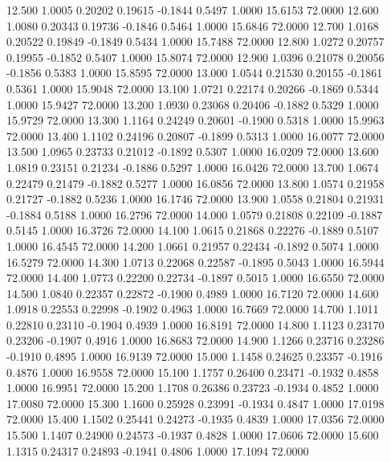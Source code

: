   12.500   1.0005   0.20202   0.19615  -0.1844   0.5497   1.0000  15.6153  72.0000
  12.600   1.0080   0.20343   0.19736  -0.1846   0.5464   1.0000  15.6846  72.0000
  12.700   1.0168   0.20522   0.19849  -0.1849   0.5434   1.0000  15.7488  72.0000
  12.800   1.0272   0.20757   0.19955  -0.1852   0.5407   1.0000  15.8074  72.0000
  12.900   1.0396   0.21078   0.20056  -0.1856   0.5383   1.0000  15.8595  72.0000
  13.000   1.0544   0.21530   0.20155  -0.1861   0.5361   1.0000  15.9048  72.0000
  13.100   1.0721   0.22174   0.20266  -0.1869   0.5344   1.0000  15.9427  72.0000
  13.200   1.0930   0.23068   0.20406  -0.1882   0.5329   1.0000  15.9729  72.0000
  13.300   1.1164   0.24249   0.20601  -0.1900   0.5318   1.0000  15.9963  72.0000
  13.400   1.1102   0.24196   0.20807  -0.1899   0.5313   1.0000  16.0077  72.0000
  13.500   1.0965   0.23733   0.21012  -0.1892   0.5307   1.0000  16.0209  72.0000
  13.600   1.0819   0.23151   0.21234  -0.1886   0.5297   1.0000  16.0426  72.0000
  13.700   1.0674   0.22479   0.21479  -0.1882   0.5277   1.0000  16.0856  72.0000
  13.800   1.0574   0.21958   0.21727  -0.1882   0.5236   1.0000  16.1746  72.0000
  13.900   1.0558   0.21804   0.21931  -0.1884   0.5188   1.0000  16.2796  72.0000
  14.000   1.0579   0.21808   0.22109  -0.1887   0.5145   1.0000  16.3726  72.0000
  14.100   1.0615   0.21868   0.22276  -0.1889   0.5107   1.0000  16.4545  72.0000
  14.200   1.0661   0.21957   0.22434  -0.1892   0.5074   1.0000  16.5279  72.0000
  14.300   1.0713   0.22068   0.22587  -0.1895   0.5043   1.0000  16.5944  72.0000
  14.400   1.0773   0.22200   0.22734  -0.1897   0.5015   1.0000  16.6550  72.0000
  14.500   1.0840   0.22357   0.22872  -0.1900   0.4989   1.0000  16.7120  72.0000
  14.600   1.0918   0.22553   0.22998  -0.1902   0.4963   1.0000  16.7669  72.0000
  14.700   1.1011   0.22810   0.23110  -0.1904   0.4939   1.0000  16.8191  72.0000
  14.800   1.1123   0.23170   0.23206  -0.1907   0.4916   1.0000  16.8683  72.0000
  14.900   1.1266   0.23716   0.23286  -0.1910   0.4895   1.0000  16.9139  72.0000
  15.000   1.1458   0.24625   0.23357  -0.1916   0.4876   1.0000  16.9558  72.0000
  15.100   1.1757   0.26400   0.23471  -0.1932   0.4858   1.0000  16.9951  72.0000
  15.200   1.1708   0.26386   0.23723  -0.1934   0.4852   1.0000  17.0080  72.0000
  15.300   1.1600   0.25928   0.23991  -0.1934   0.4847   1.0000  17.0198  72.0000
  15.400   1.1502   0.25441   0.24273  -0.1935   0.4839   1.0000  17.0356  72.0000
  15.500   1.1407   0.24900   0.24573  -0.1937   0.4828   1.0000  17.0606  72.0000
  15.600   1.1315   0.24317   0.24893  -0.1941   0.4806   1.0000  17.1094  72.0000
